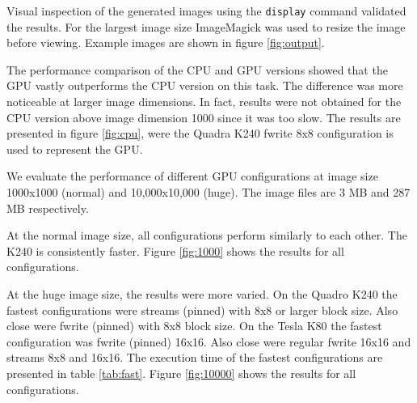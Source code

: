 \documentclass{article}
\begin{document}
Visual inspection of the generated images using the \verb|display| command
validated the results. For the largest image size ImageMagick was used to resize
the image before viewing. Example images are shown in figure \ref{fig:output}.

The performance comparison of the CPU and GPU versions showed that the GPU
vastly outperforms the CPU version on this task. The difference was more
noticeable at larger image dimensions. In fact, results were not obtained for
the CPU version above image dimension 1000 since it was too slow. The results
are presented in figure \ref{fig:cpu}, were the Quadra K240 fwrite 8x8
configuration is used to represent the GPU.

We evaluate the performance of different GPU configurations at image size
1000x1000 (normal) and 10,000x10,000 (huge). The image files are 3 MB and 287
MB respectively.

At the normal image size, all
configurations perform similarly to each other. The K240 is
consistently faster. Figure \ref{fig:1000} shows the results for all
configurations.

At the huge image size, the results were more varied. On the Quadro K240 the
fastest configurations were streams (pinned) with 8x8 or larger block size. Also
close were fwrite (pinned) with 8x8 block size. On the Tesla K80 the fastest
configuration was fwrite (pinned) 16x16. Also close were regular fwrite 16x16
and streams 8x8 and 16x16. The execution time of the fastest configurations are
presented in table \ref{tab:fast}. Figure \ref{fig:10000} shows the results for
all configurations.
\end{document}
